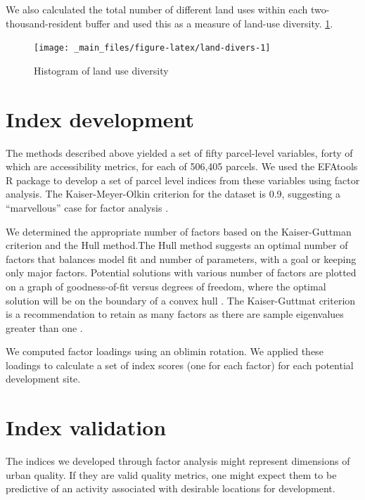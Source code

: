 \documentclass[
]{book}
\begin{document}
We also calculated the total number of different land uses within each
two-thousand-resident buffer and used this as a measure of land-use diversity.
\ref{fig:land-divers}.

\begin{figure}

{\centering \texttt{[image: \_main\_files/figure-latex/land-divers-1]} 

}

\caption{Histogram of land use diversity}\label{fig:land-divers}
\end{figure}

\hypertarget{index-development}{%
\section{Index development}\label{index-development}}

The methods described above yielded a set of fifty parcel-level variables,
forty of which are accessibility metrics, for each of 506,405 parcels. We used
the EFAtools R package \citep{EFAtools} to develop a set of parcel level indices from
these variables using factor analysis. The Kaiser-Meyer-Olkin criterion for the
dataset is 0.9, suggesting a ``marvellous'' case for factor analysis \citep{kaiser1974index}.

We determined the appropriate number of factors based on the Kaiser-Guttman criterion and the Hull method.The Hull method suggests an
optimal number of factors that balances model fit and number of parameters, with a goal
or keeping only major factors. Potential solutions with various number of factors are
plotted on a graph of goodness-of-fit versus degrees of freedom, where the optimal
solution will be on the boundary of a convex hull \citep{lorenzo2011hull}. The Kaiser-Guttmat criterion is a
recommendation to retain as many factors as there are
sample eigenvalues greater than one \citep{guttman1954some}.

We computed factor loadings
using an oblimin rotation. We applied these loadings to calculate a set of index
scores (one for each factor) for each potential development site.

\hypertarget{index-validation}{%
\section{Index validation}\label{index-validation}}

The indices we developed through factor analysis might represent dimensions of
urban quality. If they are valid quality metrics, one might expect them to
be predictive of an activity associated with desirable locations for development.
\end{document}
